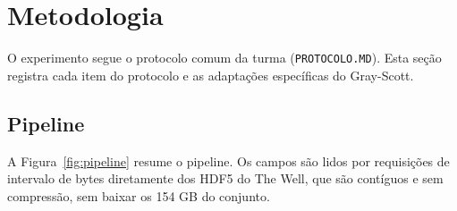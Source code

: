 \section{Metodologia}
\label{sec:metodo}

O experimento segue o protocolo comum da turma (\texttt{PROTOCOLO.MD}). Esta seção registra cada
item do protocolo e as adaptações específicas do Gray-Scott.

\subsection{Pipeline}
A Figura~\ref{fig:pipeline} resume o pipeline. Os campos são lidos por requisições de intervalo
de bytes diretamente dos HDF5 do The Well, que são contíguos e sem compressão, sem baixar os
154 GB do conjunto.

